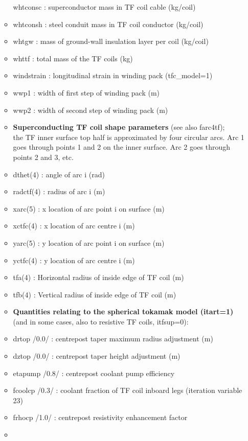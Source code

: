 \documentclass[]{article}
\begin{document}
\begin{itemize}
\begin{itemize}
    whtconsc : superconductor mass in TF coil cable (kg/coil)
  \item
    whtconsh : steel conduit mass in TF coil conductor (kg/coil)
  \item
    whtgw : mass of ground-wall insulation layer per coil (kg/coil)
  \item
    whttf : total mass of the TF coils (kg)
  \item
    windstrain : longitudinal strain in winding pack (tfc\_model=1)
  \item
    wwp1 : width of first step of winding pack (m)
  \item
    wwp2 : width of second step of winding pack (m)
  \item
    \textbf{Superconducting TF coil shape parameters} (see also
    farc4tf);\\
    the TF inner surface top half is approximated by four circular arcs.
    Arc 1 goes through points 1 and 2 on the inner surface. Arc 2 goes
    through points 2 and 3, etc.
  \item
    dthet(4) : angle of arc i (rad)
  \item
    radctf(4) : radius of arc i (m)
  \item
    xarc(5) : x location of arc point i on surface (m)
  \item
    xctfc(4) : x location of arc centre i (m)
  \item
    yarc(5) : y location of arc point i on surface (m)
  \item
    yctfc(4) : y location of arc centre i (m)
  \item
    tfa(4) : Horizontal radius of inside edge of TF coil (m)
  \item
    tfb(4) : Vertical radius of inside edge of TF coil (m)
  \item
    \textbf{Quantities relating to the spherical tokamak model
    (itart=1)} (and in some cases, also to resistive TF coils,
    itfsup=0):
  \item
    drtop /0.0/ : centrepost taper maximum radius adjustment (m)
  \item
    dztop /0.0/ : centrepost taper height adjustment (m)
  \item
    etapump /0.8/ : centrepost coolant pump efficiency
  \item
    fcoolcp /0.3/ : coolant fraction of TF coil inboard legs (iteration
    variable 23)
  \item
    frhocp /1.0/ : centrepost resistivity enhancement factor
  \item

\end{itemize}
\end{itemize}
\end{document}

